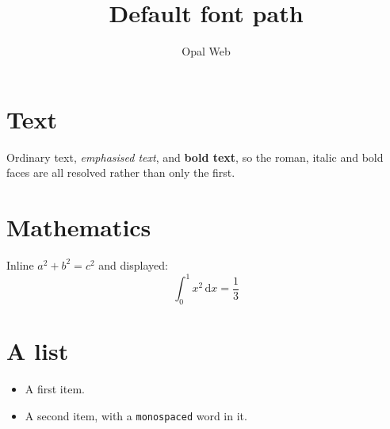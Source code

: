 \documentclass{article}
\title{Default font path}
\author{Opal Web}
\begin{document}
\maketitle

\section{Text}

Ordinary text, \emph{emphasised text}, and \textbf{bold text}, so the roman,
italic and bold faces are all resolved rather than only the first.

\section{Mathematics}

Inline $a^2 + b^2 = c^2$ and displayed:
\[
  \int_0^1 x^2 \, \mathrm{d}x = \frac{1}{3}
\]

\section{A list}

\begin{itemize}
  \item A first item.
  \item A second item, with a \texttt{monospaced} word in it.
\end{itemize}
\end{document}
